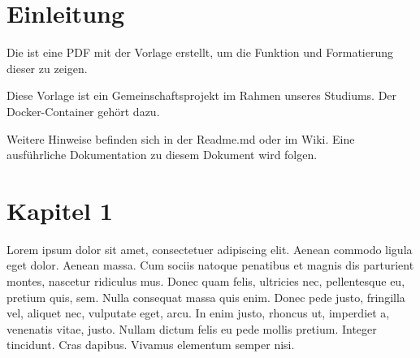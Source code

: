 \section{Einleitung}
Die ist eine PDF mit der Vorlage erstellt, um die Funktion und Formatierung dieser zu zeigen.

Diese Vorlage ist ein Gemeinschaftsprojekt im Rahmen unseres Studiums.
Der Docker-Container gehört dazu.

Weitere Hinweise befinden sich in der Readme.md oder im Wiki.
Eine ausführliche Dokumentation zu diesem Dokument wird folgen.

\section{Kapitel 1}
Lorem ipsum dolor sit amet, consectetuer adipiscing elit. 
Aenean commodo ligula eget dolor. 
Aenean massa. 
Cum sociis natoque penatibus et magnis dis parturient montes, nascetur ridiculus mus. 
Donec quam felis, ultricies nec, pellentesque eu, pretium quis, sem. Nulla consequat massa quis enim. 
Donec pede justo, fringilla vel, aliquet nec, vulputate eget, arcu. In enim justo, rhoncus ut, imperdiet a, venenatis vitae, justo. 
Nullam dictum felis eu pede mollis pretium. 
Integer tincidunt. 
Cras dapibus. 
Vivamus elementum semper nisi. 